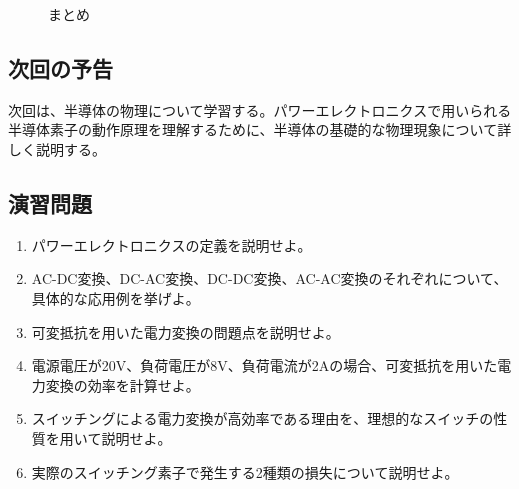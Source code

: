\begin{figure}[H]
\centering
{}
\caption{まとめ}
\label{fig:summary}
\end{figure}

\subsection{次回の予告}

次回は、半導体の物理について学習する。パワーエレクトロニクスで用いられる半導体素子の動作原理を理解するために、半導体の基礎的な物理現象について詳しく説明する。

\subsection{演習問題}

\begin{enumerate}
\item パワーエレクトロニクスの定義を説明せよ。
\item AC-DC変換、DC-AC変換、DC-DC変換、AC-AC変換のそれぞれについて、具体的な応用例を挙げよ。
\item 可変抵抗を用いた電力変換の問題点を説明せよ。
\item 電源電圧が20V、負荷電圧が8V、負荷電流が2Aの場合、可変抵抗を用いた電力変換の効率を計算せよ。
\item スイッチングによる電力変換が高効率である理由を、理想的なスイッチの性質を用いて説明せよ。
\item 実際のスイッチング素子で発生する2種類の損失について説明せよ。
\end{enumerate}
